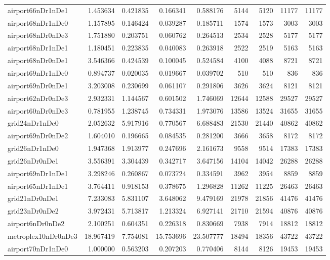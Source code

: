\begin{longtable}{|l|r|r|r|r|r|r|r|r|}
airport66nDr1nDe1 & 1.453634 & 0.421835 & 0.166341 & 0.588176 & 5144 & 5120 & 11177 & 11177 \\
airport68nDr1nDe0 & 1.157895 & 0.146424 & 0.039287 & 0.185711 & 1574 & 1573 & 3003 & 3003 \\
airport68nDr0nDe3 & 1.751880 & 0.203751 & 0.060762 & 0.264513 & 2534 & 2528 & 5177 & 5177 \\
airport68nDr1nDe1 & 1.180451 & 0.223835 & 0.040083 & 0.263918 & 2522 & 2519 & 5163 & 5163 \\
airport68nDr0nDe1 & 3.546366 & 0.424539 & 0.100045 & 0.524584 & 4100 & 4088 & 8721 & 8721 \\
airport69nDr1nDe0 & 0.894737 & 0.020035 & 0.019667 & 0.039702 & 510 & 510 & 836 & 836 \\
airport69nDr0nDe1 & 3.203008 & 0.230699 & 0.061107 & 0.291806 & 3626 & 3624 & 8121 & 8121 \\
airport62nDr0nDe3 & 2.932331 & 1.144567 & 0.601502 & 1.746069 & 12644 & 12588 & 29527 & 29527 \\
airport60nDr0nDe3 & 0.781955 & 1.238745 & 0.734331 & 1.973076 & 13586 & 13524 & 31655 & 31655 \\
grid24nDr1nDe0 & 2.052632 & 5.917916 & 0.770567 & 6.688483 & 21530 & 21440 & 40862 & 40862 \\
airport69nDr0nDe2 & 1.604010 & 0.196665 & 0.084535 & 0.281200 & 3666 & 3658 & 8172 & 8172 \\
grid26nDr1nDe0 & 1.947368 & 1.913977 & 0.247696 & 2.161673 & 9558 & 9514 & 17383 & 17383 \\
grid26nDr0nDe1 & 3.556391 & 3.304439 & 0.342717 & 3.647156 & 14104 & 14042 & 26288 & 26288 \\
airport69nDr1nDe1 & 3.298246 & 0.260867 & 0.073724 & 0.334591 & 3962 & 3954 & 8859 & 8859 \\
airport65nDr1nDe1 & 3.764411 & 0.918153 & 0.378675 & 1.296828 & 11262 & 11225 & 26463 & 26463 \\
grid21nDr0nDe1 & 7.233083 & 5.831107 & 3.648062 & 9.479169 & 21978 & 21856 & 41476 & 41476 \\
grid23nDr0nDe2 & 3.972431 & 5.713817 & 1.213324 & 6.927141 & 21710 & 21594 & 40876 & 40876 \\
airport6nDr0nDe2 & 2.100251 & 0.604351 & 0.226318 & 0.830669 & 7938 & 7914 & 18812 & 18812 \\
metroplex10nDr0nDe3 & 18.967419 & 7.754081 & 15.753696 & 23.507777 & 18494 & 18356 & 43722 & 43722 \\
airport70nDr1nDe0 & 1.000000 & 0.563203 & 0.207203 & 0.770406 & 8144 & 8126 & 19453 & 19453 \\

\end{longtable}
